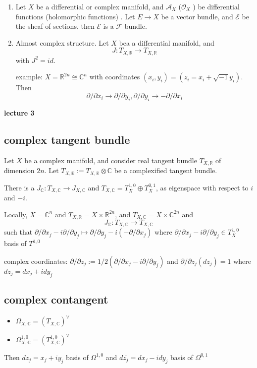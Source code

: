 \documentclass{article}
\begin{document}
\begin{enumerate}
  \item Let $X$ be a differential or complex manifold, and $\mathcal{A}_{X}$ ($\mathcal{O}_{X}$ ) be differential functions (holomorphic functions) . Let $E\to X$ be a vector bundle, and $\mathcal{E}$ be the sheaf of sections. then  $\mathcal{E}$ is a  $\mathcal{F}$ bundle.   
  \item Almost complex structure. Let $X$ bea a differential manifold, and 
    \[
      J:T_{X, \mathbb{R}}\to T_{X, \mathbb{R}}
    \]
    with $J^{2}=id$. 

    example: $X=\mathbb{R}^{2n}\cong \mathbb{C}^{n}$ with coordinates $(x_{i},y_{i})=(z_{i}=x_{i}+\sqrt{-1}y_{i})$. Then
    \[
      \partial/\partial x_{i} \to \partial/\partial y_{i}, \partial/\partial y_{i} \to -\partial/\partial x_{i}
    \]
\end{enumerate}
\textbf{lecture 3}
\subsection{complex tangent bundle}

Let $X$ be a complex manifold, and consider real tangent bundle $T_{X, \mathbb{R}}$ of dimension $2n$. Let $T_{X, \mathbb{R}}:= T_{X,\mathbb{R}}\otimes \mathbb{C}$ be a complexified tangent bundle.

There is a $J_{\mathbb{C}}:T_{X,\mathbb{C}}\to J_{X,\mathbb{C}}$ and $T_{X,\mathbb{C}}=T^{1,0}_{X}\oplus T^{0,1}_{X}$, as eigenspace with respect to $i$ and $-i$.

Locally, $X=\mathbb{C}^{n}$ and $T_{X,\mathbb{R}}=X \times \mathbb{R}^{2n}$, and $T_{X,\mathbb{C}}=X \times  \mathbb{C}^{2n}$ and 
\[
  J_{\mathbb{C}}: T_{X,\mathbb{C}}\to T_{X,\mathbb{C}}
\]
such that $\partial /\partial x_{j} - i \partial/\partial y_{j} \mapsto \partial / \partial y_{j} -i (-\partial/\partial x_{j})$ where $\partial /\partial x_{j} - i \partial/\partial y_{j} \in T^{1,0}_{X}$ basis of $T^{1,0}$ 

complex coordinates: $\partial/\partial z_{j}:= 1/2(\partial /\partial x_{j}-i\partial/\partial y_{j}) $ and $\partial /\partial z_{j} (dz_{j})=1$ where $dz_{j}=dx_{j}+idy_{j}$ 
\subsection{complex contangent}
\begin{itemize}
  \item $\Omega_{X,\mathbb{C}}=(T_{X,\mathbb{C}})^{\vee}$
  \item $\Omega_{X,\mathbb{C}}^{1,0}=(T_{X,\mathbb{C}}^{1,0})^{\vee}$
\end{itemize}
Then $dz_{j}=x_{j}+iy_{j}$ basis of $\Omega^{1,0}$ and $d\bar{z_{j}}=dx_{j}-idy_{j}$ basis of $\Omega^{0,1}$
\end{document}
